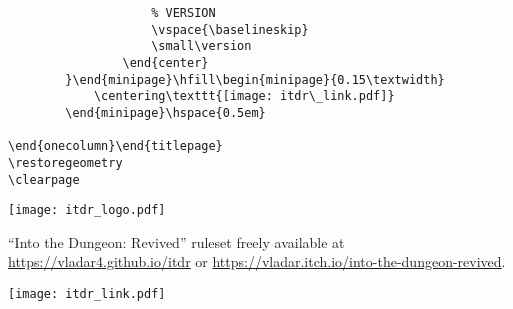 \documentclass[10pt,twoside,twocolumn,openany]{book}
\begin{document}
\begin{titlepage}
\begin{onecolumn}
\begin{minipage}{\linewidth}
\begin{lstlisting}
					% VERSION
					\vspace{\baselineskip}
					\small\version
				\end{center}
		}\end{minipage}\hfill\begin{minipage}{0.15\textwidth}
			\centering\texttt{[image: itdr\_link.pdf]}
		\end{minipage}\hspace{0.5em}
		
\end{onecolumn}\end{titlepage}
\restoregeometry
\clearpage	
\end{lstlisting}
\end{minipage}

\vfill

\noindent\hspace{-0.75em}\begin{minipage}{0.15\textwidth}
\centering\texttt{[image: itdr\_logo.pdf]}
\end{minipage}\hspace{-0.45em}\begin{minipage}{0.7\textwidth}
{\begin{center}\footnotesize
``Into the Dungeon: Revived'' ruleset freely available at\\ \href{https://vladar4.github.io/itdr}{https://vladar4.github.io/itdr} or \href{https://vladar.itch.io/into-the-dungeon-revived}{https://vladar.itch.io/into-the-dungeon-revived}.

\vspace{\baselineskip}
\small\version
\end{center}
}\end{minipage}\hfill\begin{minipage}{0.15\textwidth}
\centering\texttt{[image: itdr\_link.pdf]}
\end{minipage}\hspace{0.5em}

\end{onecolumn}\end{titlepage}
\restoregeometry
\clearpage

\end{document}
